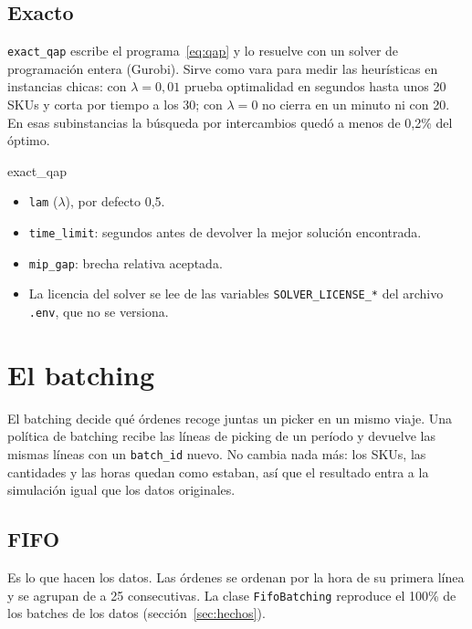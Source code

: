 \documentclass[11pt,a4paper,oneside]{report}
\newcommand{\code}[1]{\texttt{\small #1}}
\begin{document}
\section{Exacto}
\label{sec:exacto}

\code{exact\_qap} escribe el programa~\eqref{eq:qap} y lo resuelve con un solver de
programación entera (Gurobi). Sirve como vara para medir las heurísticas en instancias
chicas: con $\lambda = 0{,}01$ prueba optimalidad en segundos hasta unos 20 SKUs y corta por
tiempo a los 30; con $\lambda = 0$ no cierra en un minuto ni con 20. En esas
subinstancias la búsqueda por intercambios quedó a menos de 0,2\% del óptimo.

\begin{hiper}{exact\_qap}
\begin{itemize}
  \item \code{lam} ($\lambda$), por defecto 0,5.
  \item \code{time\_limit}: segundos antes de devolver la mejor solución encontrada.
  \item \code{mip\_gap}: brecha relativa aceptada.
  \item La licencia del solver se lee de las variables \code{SOLVER\_LICENSE\_*} del archivo
        \code{.env}, que no se versiona.
\end{itemize}
\end{hiper}

\chapter{El batching}
\label{cap:batching}

El batching decide qué órdenes recoge juntas un picker en un mismo viaje. Una política de
batching recibe las líneas de picking de un período y devuelve las mismas líneas con un
\code{batch\_id} nuevo. No cambia nada más: los SKUs, las cantidades y las horas quedan como
estaban, así que el resultado entra a la simulación igual que los datos originales.

\section{FIFO}

Es lo que hacen los datos. Las órdenes se ordenan por la hora de su primera línea y se agrupan
de a 25 consecutivas. La clase \code{FifoBatching} reproduce el 100\% de los batches de los
datos (sección~\ref{sec:hechos}).
\end{document}
